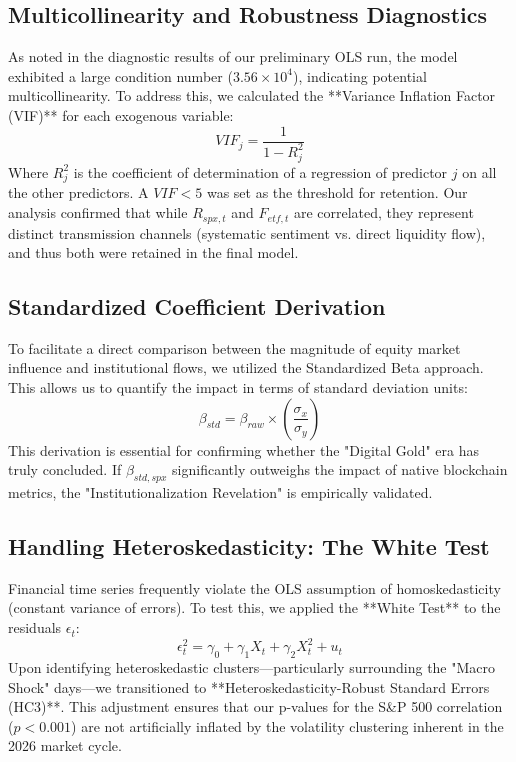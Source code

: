 \documentclass[10pt, conference, compsocconf]{IEEEtran}
\begin{document}
\subsection{Multicollinearity and Robustness Diagnostics}

As noted in the diagnostic results of our preliminary OLS run, the model exhibited a large condition number ($3.56 \times 10^4$), indicating potential multicollinearity. To address this, we calculated the **Variance Inflation Factor (VIF)** for each exogenous variable:
\begin{equation}
VIF_j = \frac{1}{1 - R_j^2}
\end{equation}
Where $R_j^2$ is the coefficient of determination of a regression of predictor $j$ on all the other predictors. A $VIF < 5$ was set as the threshold for retention. Our analysis confirmed that while $R_{spx,t}$ and $F_{etf,t}$ are correlated, they represent distinct transmission channels (systematic sentiment vs. direct liquidity flow), and thus both were retained in the final model.

\subsection{Standardized Coefficient Derivation}

To facilitate a direct comparison between the magnitude of equity market influence and institutional flows, we utilized the Standardized Beta approach. This allows us to quantify the impact in terms of standard deviation units:
\begin{equation}
\beta_{std} = \beta_{raw} \times \left( \frac{\sigma_{x}}{\sigma_{y}} \right)
\end{equation}
This derivation is essential for confirming whether the "Digital Gold" era has truly concluded. If $\beta_{std, spx}$ significantly outweighs the impact of native blockchain metrics, the "Institutionalization Revelation" is empirically validated.

\subsection{Handling Heteroskedasticity: The White Test}

Financial time series frequently violate the OLS assumption of homoskedasticity (constant variance of errors). To test this, we applied the **White Test** to the residuals $\epsilon_t$:
\begin{equation}
\epsilon^2_t = \gamma_0 + \gamma_1 X_t + \gamma_2 X^2_t + u_t
\end{equation}
Upon identifying heteroskedastic clusters—particularly surrounding the "Macro Shock" days—we transitioned to **Heteroskedasticity-Robust Standard Errors (HC3)**. This adjustment ensures that our p-values for the S\&P 500 correlation ($p < 0.001$) are not artificially inflated by the volatility clustering inherent in the 2026 market cycle.
\end{document}
